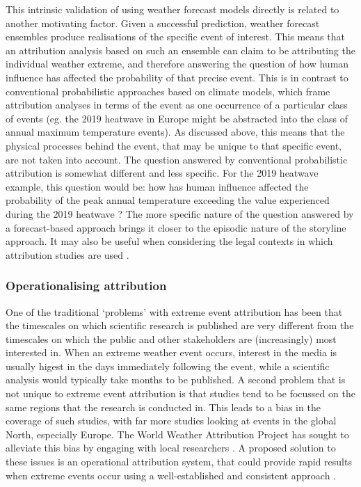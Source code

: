     This intrinsic validation of using weather forecast models directly is related to another motivating factor. Given a successful prediction, weather forecast ensembles produce realisations of the specific event of interest. This means that an attribution analysis based on such an ensemble can claim to be attributing the individual weather extreme, and therefore answering the question of how human influence has affected the probability of that precise event. This is in contrast to conventional probabilistic approaches based on climate models, which frame attribution analyses in terms of the event as one occurrence of a particular class of events (eg. the 2019 heatwave in Europe might be abstracted into the class of annual maximum temperature events). As discussed above, this means that the physical processes behind the event, that may be unique to that specific event, are not taken into account. The question answered by conventional probabilistic attribution is somewhat different and less specific. For the 2019 heatwave example, this question would be: how has human influence affected the probability of the peak annual temperature exceeding the value experienced during the 2019 heatwave \citep{vautard_human_2020}? The more specific nature of the question answered by a forecast-based approach brings it closer to the episodic nature of the storyline approach. It may also be useful when considering the legal contexts in which attribution studies are used \citep{lloyd_climate_2021-1}.

    \subsubsection{Operationalising attribution}

      One of the traditional `problems' with extreme event attribution has been that the timescales on which scientific research is published are very different from the timescales on which the public and other stakeholders are (increasingly) most interested in. When an extreme weather event occurs, interest in the media is usually higest in the days immediately following the event, while a scientific analysis would typically take months to be published. A second problem that is not unique to extreme event attribution is that studies tend to be focussed on the same regions that the research is conducted in. This leads to a bias in the coverage of such studies, with far more studies looking at events in the global North, especially Europe. The World Weather Attribution Project has sought to alleviate this bias by engaging with local researchers \citep{van_oldenborgh_pathways_2021}. A proposed solution to these issues is an operational attribution system, that could provide rapid results when extreme events occur using a well-established and consistent approach \citep{noauthor_attribution_2016}.

